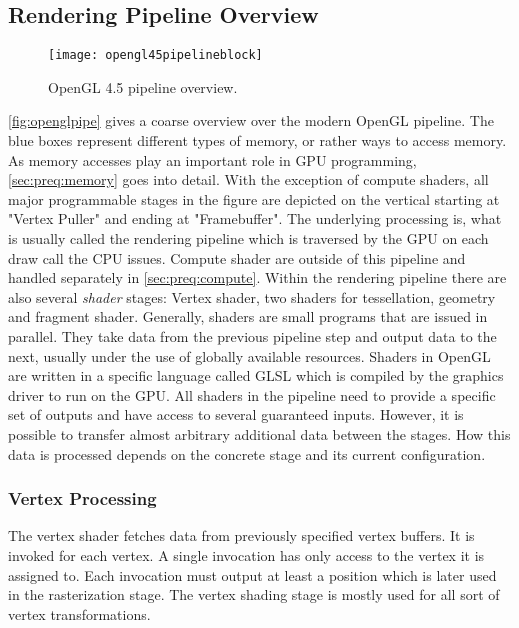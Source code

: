 \documentclass[thesis.tex]{subfiles}
\begin{document}
\subsection{Rendering Pipeline Overview}
\begin{figure}[h]
\centering
\texttt{[image: opengl45pipelineblock]}
\caption{\cite{bib:openglspec} OpenGL 4.5 pipeline overview.}
\label{fig:openglpipe}
\end{figure}
\autoref{fig:openglpipe} gives a coarse overview over the modern OpenGL pipeline.
The blue boxes represent different types of memory, or rather ways to access memory.
As memory accesses play an important role in GPU programming, \autoref{sec:preq:memory} goes into detail.
With the exception of compute shaders, all major programmable stages in the figure are depicted on the vertical starting at "Vertex Puller" and ending at "Framebuffer".
The underlying processing is, what is usually called the rendering pipeline which is traversed by the GPU on each draw call the CPU issues.
Compute shader are outside of this pipeline and handled separately in \autoref{sec:preq:compute}.
Within the rendering pipeline there are also several \emph{shader} stages: Vertex shader, two shaders for tessellation, geometry and fragment shader.
Generally, shaders are small programs that are issued in parallel.
They take data from the previous pipeline step and output data to the next, usually under the use of globally available resources.
Shaders in OpenGL are written in a specific language called GLSL which is compiled by the graphics driver to run on the GPU.
All shaders in the pipeline need to provide a specific set of outputs and have access to several guaranteed inputs.
However, it is possible to transfer almost arbitrary additional data between the stages.
How this data is processed depends on the concrete stage and its current configuration.

\subsubsection{Vertex Processing}
The vertex shader fetches data from previously specified vertex buffers.
It is invoked for each vertex.
A single invocation has only access to the vertex it is assigned to.
Each invocation must output at least a position which is later used in the rasterization stage.
The vertex shading stage is mostly used for all sort of vertex transformations.
\end{document}
